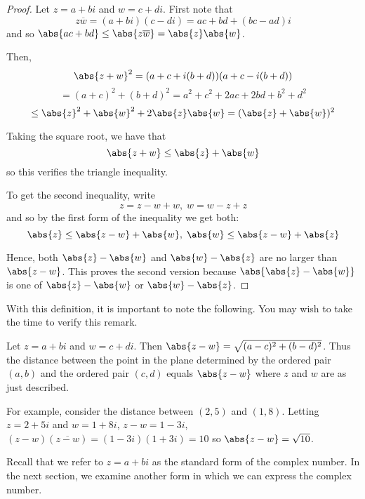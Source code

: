 \begin{proof}
  Let $z=a+bi$ and $w=c+di$. First note that
  \begin{equation*}
    z
    \overline{w}=(a+bi) (c-di) =ac+bd+(
    bc-ad)i
  \end{equation*}
  and so $\abs{ac+bd}\leq \abs{z\overline{w}}=\abs{z}\abs{w}$.

  Then,
  \begin{equation*}
    \abs{z+w}^{2}=(a+c+i(b+d)) (
    a+c-i(b+d))
  \end{equation*}
  \begin{equation*}
    =(a+c) ^{2}+(b+d)
    ^{2}=a^{2}+c^{2}+2ac+2bd+b^{2}+d^{2}
  \end{equation*}
  \begin{equation*}
    \leq \abs{z}^{2}+\abs{w}^{2}+2\abs{z}\abs{w}=(\abs{z}+\abs{w}) ^{2}
  \end{equation*}

  Taking the square root, we have that 
  \begin{equation*}
    \abs{z+w}\leq \abs{z}+\abs{w}
  \end{equation*}
  so this verifies the triangle inequality. 

  To get the  second inequality, write
  \begin{equation*}
    z=z-w+w,\;w=w-z+z
  \end{equation*}
  and so by the first form of the inequality we get both:
  \begin{equation*}
    \abs{z}\leq \abs{z-w}+\abs{w},\;\abs{w}\leq \abs{z-w}+\abs{z}\end{equation*}

  Hence,  both $\abs{z}-\abs{w}$ and 
  $\abs{w}-\abs{z}$ are no larger than 
  $\abs{z-w}$. This proves the second version because 
  $\abs{\abs{z}-\abs{w}}$ is
  one of $\abs{z}-\abs{w}$ or $\abs{w}-\abs{z}$. 
\end{proof}

With this definition, it is important to note the following. You may wish to take
the time to verify this remark.

Let $z=a+bi$ and $w=c+di$. Then $\abs{z-w} =\sqrt{(
  a-c) ^{2}+(b-d) ^{2}}$. Thus the distance between the
point in the plane determined by the ordered pair $(a,b) $ and
the ordered pair $(c,d) $ equals $\abs{z-w} $ where $z$
and $w$ are as just described.

For example, consider the distance between $(2,5) $ and $(
1,8)$. Letting $z=2+5i$ and $w=1+8i$, $z-w=1-3i$, $(z-w)
(\overline{z-w}) =(1-3i) (1+3i)
= 10$ so $\abs{z-w}=\sqrt{10}$.

Recall that we refer to $z=a+bi$ as the standard form of the complex number. In the next section, 
we examine another form in which we can express the complex number. 
